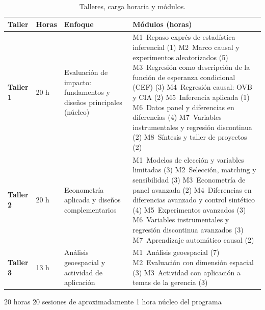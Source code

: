 \documentclass[11pt]{article}
\begin{document}
\begin{table}[ht]
\centering
\small
\renewcommand{\arraystretch}{1.25}
\caption{Talleres, carga horaria y módulos.}
\label{tab:estructura}
\begin{tabularx}{\linewidth}{@{}P{1.55cm} P{1.0cm} P{3.6cm} L@{}}
\toprule
\sffamily\bfseries Taller & \sffamily\bfseries Horas & \sffamily\bfseries Enfoque & \sffamily\bfseries Módulos (horas) \\
\midrule
\textbf{Taller 1} & 20 h &
Evaluación de impacto: fundamentos y diseños principales (núcleo) &
M1~Repaso exprés de estadística inferencial (1)\newline
M2~Marco causal y experimentos aleatorizados (5)\newline
M3~Regresión como descripción de la función de esperanza condicional (CEF) (3)\newline
M4~Regresión causal: OVB y CIA (2)\newline
M5~Inferencia aplicada (1)\newline
M6~Datos panel y diferencias en diferencias (4)\newline
M7~Variables instrumentales y regresión discontinua (2)\newline
M8~Síntesis y taller de proyectos (2) \\
\midrule
\textbf{Taller 2} & 20 h &
Econometría aplicada y diseños complementarios &
M1~Modelos de elección y variables limitadas (3)\newline
M2~Selección, matching y sensibilidad (3)\newline
M3~Econometría de panel avanzada (2)\newline
M4~Diferencias en diferencias avanzado y control sintético (4)\newline
M5~Experimentos avanzados (3)\newline
M6~Variables instrumentales y regresión discontinua avanzados (3)\newline
M7~Aprendizaje automático causal (2) \\
\midrule
\textbf{Taller 3} & 13 h &
Análisis geoespacial y actividad de aplicación &
M1~Análisis geoespacial (7)\newline
M2~Evaluación con dimensión espacial (3)\newline
M3~Actividad con aplicación a temas de la gerencia (3) \\
\bottomrule
\end{tabularx}
\end{table}

  {20 horas \textperiodcentered{} 20 sesiones de aproximadamente 1 hora \textperiodcentered{} núcleo del programa}
\end{document}
